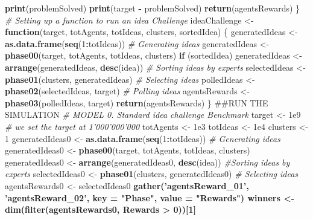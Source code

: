 \documentclass[]{elsarticle} %
\newenvironment{Shaded}{\begin{snugshade}}{\end{snugshade}}
\newcommand{\KeywordTok}[1]{\textcolor[rgb]{0.13,0.29,0.53}{\textbf{#1}}}
\newcommand{\DataTypeTok}[1]{\textcolor[rgb]{0.13,0.29,0.53}{#1}}
\newcommand{\DecValTok}[1]{\textcolor[rgb]{0.00,0.00,0.81}{#1}}
\newcommand{\FloatTok}[1]{\textcolor[rgb]{0.00,0.00,0.81}{#1}}
\newcommand{\StringTok}[1]{\textcolor[rgb]{0.31,0.60,0.02}{#1}}
\newcommand{\CommentTok}[1]{\textcolor[rgb]{0.56,0.35,0.01}{\textit{#1}}}
\newcommand{\ControlFlowTok}[1]{\textcolor[rgb]{0.13,0.29,0.53}{\textbf{#1}}}
\newcommand{\OperatorTok}[1]{\textcolor[rgb]{0.81,0.36,0.00}{\textbf{#1}}}
\newcommand{\NormalTok}[1]{#1}
\begin{document}
\begin{Shaded}
\begin{Highlighting}[]
{{\KeywordTok{print}\NormalTok{(problemSolved)}
\KeywordTok{print}\NormalTok{(target }\OperatorTok{-}\StringTok{ }\NormalTok{problemSolved)}
\KeywordTok{return}\NormalTok{(agentsRewards)}
\NormalTok{\}}
\CommentTok{# Setting up a function to run an idea Challenge}
\NormalTok{ideaChallenge <-}
\ControlFlowTok{function}\NormalTok{(target,}
\NormalTok{totAgents,}
\NormalTok{totIdeas,}
\NormalTok{clusters,}
\NormalTok{sortedIdea) \{}
\NormalTok{generatedIdeas <-}\StringTok{ }\KeywordTok{as.data.frame}\NormalTok{(}\KeywordTok{seq}\NormalTok{(}\DecValTok{1}\OperatorTok{:}\NormalTok{totIdeas))}
\CommentTok{# Generating ideas}
\NormalTok{generatedIdeas <-}
\KeywordTok{phase00}\NormalTok{(target, totAgents, totIdeas, clusters) }
\ControlFlowTok{if}\NormalTok{ (sortedIdea)}
\NormalTok{generatedIdeas <-}
\KeywordTok{arrange}\NormalTok{(generatedIdeas, }\KeywordTok{desc}\NormalTok{(idea)) }\CommentTok{# Sorting ideas by experts}
\NormalTok{selectedIdeas <-}
\KeywordTok{phase01}\NormalTok{(clusters, generatedIdeas) }\CommentTok{# Selecting ideas}
\NormalTok{polledIdeas <-}\StringTok{ }\KeywordTok{phase02}\NormalTok{(selectedIdeas, target) }\CommentTok{# Polling ideas}
\NormalTok{agentsRewards <-}\StringTok{ }\KeywordTok{phase03}\NormalTok{(polledIdeas, target)}
\KeywordTok{return}\NormalTok{(agentsRewards)}
\NormalTok{\}}
\NormalTok{##RUN THE SIMULATION}
\CommentTok{# MODEL 0. Standard idea challenge Benchmark}
\NormalTok{target <-}\StringTok{ }\FloatTok{1e9} \CommentTok{# we set the target at 1'000'000'000}
\NormalTok{totAgents <-}\StringTok{ }\FloatTok{1e3}
\NormalTok{totIdeas <-}\StringTok{ }\FloatTok{1e4}
\NormalTok{clusters <-}\StringTok{ }\DecValTok{1}
\NormalTok{generatedIdeas0 <-}\StringTok{ }\KeywordTok{as.data.frame}\NormalTok{(}\KeywordTok{seq}\NormalTok{(}\DecValTok{1}\OperatorTok{:}\NormalTok{totIdeas))}
\CommentTok{# Generating ideas}
\NormalTok{generatedIdeas0 <-}
\KeywordTok{phase00}\NormalTok{(target, totAgents, totIdeas, clusters) }
\NormalTok{generatedIdeas0 <-}
\KeywordTok{arrange}\NormalTok{(generatedIdeas0, }\KeywordTok{desc}\NormalTok{(idea)) }\CommentTok{#Sorting ideas by experts}
\NormalTok{selectedIdeas0 <-}
\KeywordTok{phase01}\NormalTok{(clusters, generatedIdeas0) }\CommentTok{# Selecting ideas}
\NormalTok{agentsRewards0 <-}\StringTok{ }\NormalTok{selectedIdeas0 }\OperatorTok{%>%}
\KeywordTok{gather}\NormalTok{(}\StringTok{'agentsReward_01'}\NormalTok{,}
\StringTok{'agentsReward_02'}\NormalTok{,}
\DataTypeTok{key =} \StringTok{"Phase"}\NormalTok{,}
\DataTypeTok{value =} \StringTok{"Rewards"}\NormalTok{)}
\NormalTok{winners <-}\StringTok{ }\KeywordTok{dim}\NormalTok{(}\KeywordTok{filter}\NormalTok{(agentsRewards0, Rewards }\OperatorTok{>}\StringTok{ }\DecValTok{0}\NormalTok{))[}\DecValTok{1}\NormalTok{]}
}}}
\end{Highlighting}
\end{Shaded}
\end{document}
